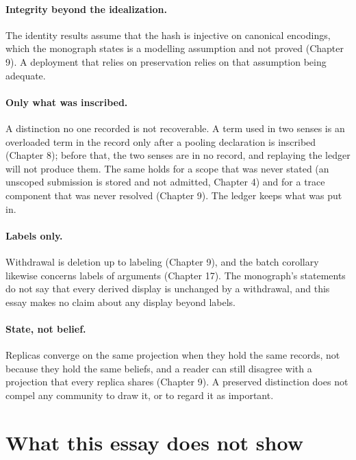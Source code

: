 \documentclass[11pt]{article}
\theoremstyle{plain}
\theoremstyle{definition}
\theoremstyle{remark}
\begin{document}
\paragraph{Integrity beyond the idealization.} The identity results assume that the hash is injective on canonical encodings, which the monograph states is a modelling assumption and not proved (Chapter 9). A deployment that relies on preservation relies on that assumption being adequate.

\paragraph{Only what was inscribed.} A distinction no one recorded is not recoverable. A term used in two senses is an overloaded term in the record only after a pooling declaration is inscribed (Chapter 8); before that, the two senses are in no record, and replaying the ledger will not produce them. The same holds for a scope that was never stated (an unscoped submission is stored and not admitted, Chapter 4) and for a trace component that was never resolved (Chapter 9). The ledger keeps what was put in.

\paragraph{Labels only.} Withdrawal is deletion up to labeling (Chapter 9), and the batch corollary likewise concerns labels of arguments (Chapter 17). The monograph's statements do not say that every derived display is unchanged by a withdrawal, and this essay makes no claim about any display beyond labels.

\paragraph{State, not belief.} Replicas converge on the same projection when they hold the same records, not because they hold the same beliefs, and a reader can still disagree with a projection that every replica shares (Chapter 9). A preserved distinction does not compel any community to draw it, or to regard it as important.

\section{What this essay does not show}\label{sec:notshown}
\end{document}
